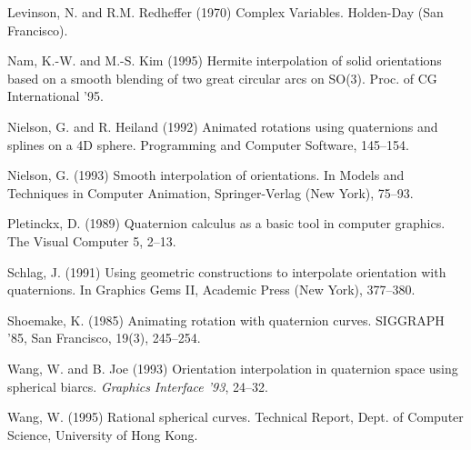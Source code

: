 \begin{thebibliography}{99}
Levinson, N. and R.M. Redheffer (1970)
Complex Variables.
Holden-Day (San Francisco).

Nam, K.-W. and M.-S. Kim (1995)
Hermite interpolation of solid orientations based on a smooth blending
of two great circular arcs on SO(3).
Proc. of CG International '95.

Nielson, G. and R. Heiland (1992)
Animated rotations using quaternions and splines on a 4D sphere.
Programming and Computer Software, 145--154.

Nielson, G. (1993)
Smooth interpolation of orientations.
In Models and Techniques in Computer Animation, Springer-Verlag (New York),
75--93.

Pletinckx, D. (1989) 
Quaternion calculus as a basic tool in computer graphics.
The Visual Computer 5, 2--13.

Schlag, J. (1991) Using geometric constructions to interpolate
orientation with quaternions.  In Graphics Gems II, Academic Press (New York),
377--380.

Shoemake, K. (1985) Animating rotation with quaternion curves.
SIGGRAPH '85, San Francisco, 19(3), 245--254.

Wang, W. and B. Joe (1993)
Orientation interpolation in quaternion space using spherical biarcs.
{\em Graphics Interface '93}, 24--32.

Wang, W. (1995) 
Rational spherical curves.  Technical Report, Dept. of Computer Science,
University of Hong Kong.

\end{thebibliography}




